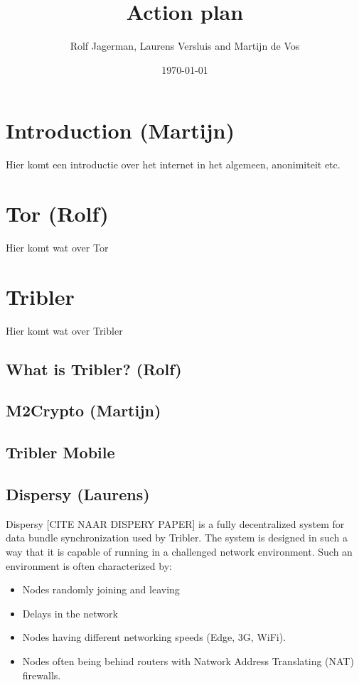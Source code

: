 \documentclass[11pt]{article}
\title{Action plan}
\author{Rolf Jagerman, Laurens Versluis and Martijn de Vos}
\date{\today}
\begin{document}
\maketitle

\pagebreak

\section{Introduction (Martijn)}
Hier komt een introductie over het internet in het algemeen, anonimiteit etc.

\section{Tor (Rolf)}
Hier komt wat over Tor

\section{Tribler}
Hier komt wat over Tribler

\subsection{What is Tribler? (Rolf)}

\subsection{M2Crypto (Martijn)}

\subsection{Tribler Mobile}

\subsection{Dispersy (Laurens)}
Dispersy [CITE NAAR DISPERY PAPER] is a fully decentralized system for data bundle synchronization used by Tribler. The system is designed in such a way that it is capable of running in a challenged network environment. Such an environment is often characterized by:
\begin{itemize}
\item Nodes randomly joining and leaving
\item Delays in the network
\item Nodes having different networking speeds (Edge, 3G, WiFi).
\item Nodes often being behind routers with Natwork Address Translating (NAT) firewalls.
\end{itemize}
\end{document}

